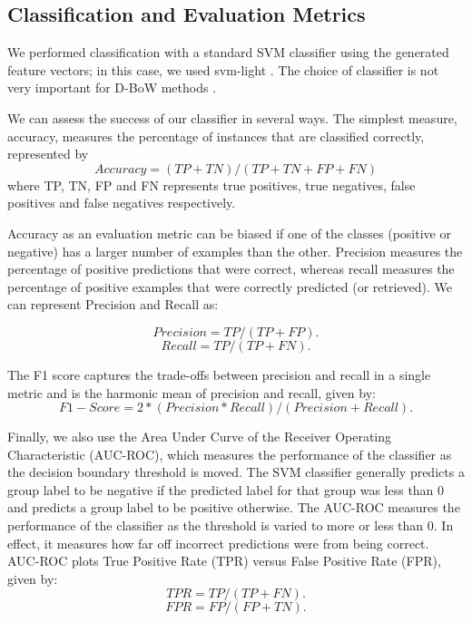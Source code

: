 \subsection{Classification and Evaluation Metrics}

We performed classification with a standard SVM classifier using the generated feature vectors; in this case, we used svm-light \cite{joachims08}. The choice of classifier is not very important for D-BoW methods \cite{amores13}.


We can assess the success of our classifier in several ways. The simplest measure, accuracy, measures the percentage of instances 
that are classified correctly, represented by 
\begin{equation}
Accuracy = (TP + TN)/ (TP + TN + FP + FN)  \label{eqn:acc} 
\end{equation}
where TP, TN, FP and FN represents true positives, true negatives, false positives and false negatives respectively.

Accuracy as an evaluation metric can be biased if one of the classes 
(positive or negative)  has a larger number of examples than the other.   
Precision measures the percentage of positive predictions that 
were correct, 
whereas recall measures the percentage of positive 
examples that were correctly predicted (or retrieved). 
We can represent Precision and Recall as:

\begin{equation}
Precision = TP / (TP + FP). \label{eqn:prec}
\end{equation}
\begin{equation}
Recall = TP / (TP +FN). \label{eqn:roc}
\end{equation}

The F1 score captures the trade-offs between precision and recall in a
single metric and is the harmonic mean of precision and recall, given by:
\begin{equation}
F1-Score = 2 * (Precision * Recall)/ (Precision + Recall). \label{eqn:f1}
\end{equation}

Finally, we also use the Area Under Curve of the Receiver Operating Characteristic (AUC-ROC), which measures the performance of the classifier as the decision boundary threshold is moved. The SVM classifier generally predicts a group label to be negative if the predicted label for that group was less than 0 and predicts a group label to be positive otherwise. The AUC-ROC measures the performance of the classifier as the threshold is varied to more or less than 0. In effect, it measures how far off incorrect predictions were from being correct. AUC-ROC plots True Positive Rate (TPR) versus False Positive Rate (FPR), given by:
\begin{equation}
TPR  = TP / (TP + FN). \label{eqn:roc}
\end{equation}
\begin{equation}
FPR = FP / (FP + TN). \label{eqn:prec}
\end{equation}

